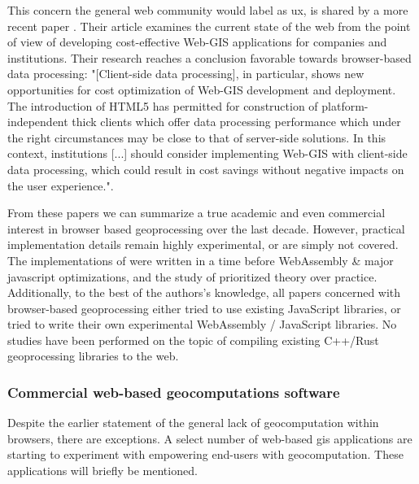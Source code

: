 This concern the general web community would label as \ac{ux}, is shared by a more recent paper \cite{kulawiak_analysis_2019}. 
Their article examines the current state of the web from the point of view of developing cost-effective Web-GIS applications for companies and institutions. 
Their research reaches a conclusion favorable towards browser-based data processing: "[Client-side data processing], in particular, shows new opportunities for cost optimization of Web-GIS development and deployment. 
The introduction of HTML5 has permitted for construction of platform-independent thick clients which offer data processing performance which under the right circumstances may be close to that of server-side solutions. 
In this context, institutions [...] should consider implementing Web-GIS with client-side data processing, which could result in cost savings without negative impacts on the user experience.".


From these papers we can summarize a true academic and even commercial interest in browser based geoprocessing over the last decade. 
However, practical implementation details remain highly experimental, or are simply not covered.  
The implementations of \cite{panidi_hybrid_2015, hamilton_client-side_2014} were written in a time before WebAssembly \& major javascript optimizations, and the study of \cite{kulawiak_analysis_2019} prioritized theory over practice. 
Additionally, to the best of the authors's knowledge, all papers concerned with browser-based geoprocessing either tried to use existing JavaScript libraries, or tried to write their own experimental WebAssembly / JavaScript libraries. 
No studies have been performed on the topic of compiling existing C++/Rust geoprocessing libraries to the web. 

\subsubsection*{Commercial web-based geocomputations software}
Despite the earlier statement of the general lack of \ac{geocomputation} within browsers, there are exceptions. 
A select number of web-based \ac{gis} applications are starting to experiment with empowering end-users with geocomputation. 
These applications will briefly be mentioned.
 
